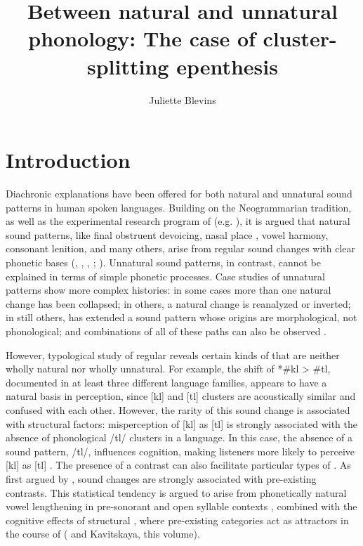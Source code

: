 \documentclass[output=paper,
modfonts
]{LSP/langsci}
\title{Between natural and unnatural phonology: The case of cluster-splitting epenthesis }
\author{Juliette Blevins\affiliation{The Graduate Center, CUNY}}
\begin{document}
\maketitle

\section{Introduction}

Diachronic explanations have been offered for both natural and unnatural
sound patterns in human spoken languages. Building on the Neogrammarian
tradition, as well as the experimental research program of \citeauthor{ohala1971a} (e.g. \citeyear{ohala1971a, ohala1974a, ohala1993a}), it is argued that natural sound patterns, like final obstruent
devoicing, nasal place , vowel harmony, consonant lenition,
and many others, arise from regular sound changes with
clear phonetic bases (\citealt{blevins2004}, \citeyear{blevins2006b}, \citeyear{blevins2008a}, \citeyear{blevins2015a}; \citealt{anderson2016a}).
Unnatural sound patterns, in contrast, cannot be explained in terms of
simple phonetic processes. Case studies of unnatural patterns show more
complex histories: in some cases more than one natural change has been
collapsed; in others, a natural change is reanalyzed or inverted; in
still others,  has extended a sound pattern whose origins are
morphological, not phonological; and combinations of all of these paths
can also be observed \citep{bach1972a,anderson1981,buckley2000a,vaux2002a,blevins2008a,blevins2008b,blevins2008c,garrett2009a,anderson2016a}.

However, typological study of regular  reveals certain kinds
of  that are neither wholly natural nor wholly unnatural.
For example, the shift of *\#kl \textgreater{} \#tl, documented in at
least three different language families, appears to have a natural basis
in perception, since {[}kl{]} and {[}tl{]} clusters are acoustically
similar and confused with each other. However, the rarity of this sound
change is associated with structural factors: misperception of {[}kl{]}
as {[}tl{]} is strongly associated with the absence of phonological /tl/
clusters in a language. In this case, the absence of a sound pattern,
/tl/, influences cognition, making listeners more likely to perceive
{[}kl{]} as {[}tl{]} \citep{blevinsju2009a}. The presence of a
contrast can also facilitate particular types of . As first
argued by \citet{deChene1979},  sound
changes are strongly associated with pre-existing 
contrasts. This statistical tendency is argued to arise from
phonetically natural vowel lengthening in pre-sonorant and open syllable
contexts \citep{kavitskaya2002}, combined with the cognitive effects of
structural , where pre-existing categories act as attractors in
the course of  (\citealt[150--155]{blevins2004} and Kavitskaya, this volume).
\end{document}

